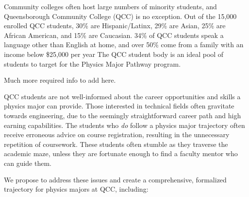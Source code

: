 \documentclass[12pt]{article}
\begin{document}
	
Community colleges often host large numbers of minority students, and Queensborough Community College (QCC) is no exception.  Out of the 15,000 enrolled QCC students, 30\% are Hispanic/Latinx, 29\% are Asian, 25\% are African American, and 15\% are Caucasian.  34\% of QCC students speak a language other than English at home, and over 50\% come from a family with an income below \$25,000 per year \citep{QCCweb} The QCC student body is an ideal pool of students to target for the Physics Major Pathway program.

Much more required info to add here.




QCC students are not well-informed about the career opportunities and skills a physics major can provide.  Those interested in technical fields often gravitate towards engineering, due to the seemingly straightforward career path and high earning capabilities.  The students who {\em do} follow a physics major trajectory often receive erroneous advice on course registration, resulting in the unnecessary repetition of coursework.  These students often stumble as they traverse the academic maze, unless they are fortunate enough to find a faculty mentor who can guide them.

We propose to address these issues and create a comprehensive, formalized trajectory for physics majors at QCC, including:
\vspace{-2mm}
\end{document}
